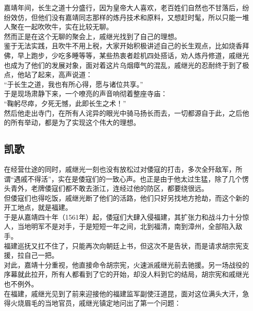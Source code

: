 \begin{multicols}{\theparacolNo}
嘉靖年间，长生之道十分盛行，因为皇帝大人喜欢，老百姓们自然也不甘落后，纷纷效仿，但他们没有嘉靖同志那样的炼丹技术和原料，又想赶时髦，所以只能一堆人聚在一起吹吹牛，实在比较无聊。\\

然而正是在这个无聊的聚会上，戚继光找到了自己的理想。\\

鉴于无法实践，且吹牛不用上税，大家开始积极讲述自己的长生观点，比如烧香拜佛，早上跑步，少吃多睡等等，某些热衷者趁机四处搭话，劝人炼丹修道，戚继光也成为了他们的发展对象，面对着这片乌烟瘴气的混乱，戚继光的忍耐终于到了极点，他站了起来，高声说道：\\

“于长生之道，我也有所心得，愿与诸位共享。”\\

于是现场肃静下来，一个嘹亮的声音响彻着整座寺庙：\\

“鞠躬尽瘁，夕死无憾，此即长生之术！”\\

然后他走出寺门，在所有人诧异的眼光中骑马扬长而去，一切都源自于此，之后他的所有举动，都是为了实现这个伟大的理想。\\

\subsection{凯歌}
在经营仕途的同时，戚继光一刻也没有放松过对倭寇的打击，多次全歼敌军，所谓“遇戚不得活”，实在是倭寇们的一致心声。也正是由于他太过生猛，除了几个愣头青外，老牌倭寇们都不敢去浙江，连经过他的防区，都要绕很远。\\

但倭寇们也得吃饭，戚继光断了他们的活路，他们只好另找地方抢劫，而这个新的开工地点，就是福建。\\

于是从嘉靖四十年（1561年）起，倭寇们大肆入侵福建，其扩张力和战斗力十分惊人，当地明军不是对手，于是短短一年之间，北到福清，南到漳州，全部陷入敌手。\\

福建巡抚又扛不住了，只能再次向朝廷上书，但这次不是告状，而是请求胡宗宪支援，拉自己一把。\\

对此，嘉靖十分重视，他直接命令胡宗宪，火速派戚继光前去驰援。另一场战役的序幕就此拉开，所有人都看到了它的开始，却没人料到它的结局，胡宗宪和戚继光也不例外。\\

在福建，戚继光见到了前来迎接他的福建监军副使汪道昆，面对这位满头大汗，急得火烧眉毛的当地官员，戚继光镇定地问出了第一个问题：\\


\end{multicols}
